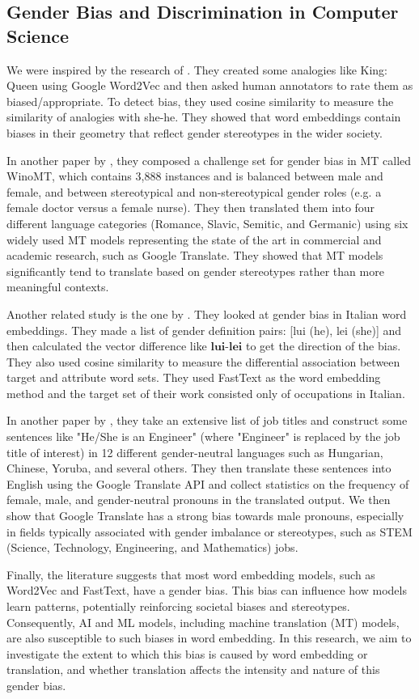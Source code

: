 \subsection{Gender Bias and Discrimination in Computer Science}

We were inspired by the research of \cite{bolukbasi2016man}. They created some analogies like King: Queen using Google Word2Vec and then asked human annotators to rate them as biased/appropriate. To detect bias, they used cosine similarity to measure the similarity of analogies with she-he. They showed that word embeddings contain biases in their geometry that reflect gender stereotypes in the wider society. 

In another paper by \cite{Stanovsky2019-hs}, they composed a challenge set for gender bias in MT called WinoMT, which contains 3,888 instances and is balanced between male and female, and between stereotypical and non-stereotypical gender roles (e.g. a female doctor versus a female nurse). They then translated them into four different language categories (Romance, Slavic, Semitic, and Germanic) using six widely used MT models representing the state of the art in commercial and academic research, such as Google Translate. They showed that MT models significantly tend to translate based on gender stereotypes rather than more meaningful contexts.

Another related study is the one by \cite{Biasion2020-yb}. They looked at gender bias in Italian word embeddings. They made a list of gender definition pairs: [lui (he), lei (she)] and then calculated the vector difference like \(\mathbf{lui}\)-\(\mathbf{lei}\) to get the direction of the bias. They also used cosine similarity to measure the differential association between target and attribute word sets. They used FastText as the word embedding method and the target set of their work consisted only of occupations in Italian. 

In another paper by \cite{Prates2020-dc}, they take an extensive list of job titles and construct some sentences like "He/She is an Engineer" (where "Engineer" is replaced by the job title of interest) in 12 different gender-neutral languages such as Hungarian, Chinese, Yoruba, and several others. They then translate these sentences into English using the Google Translate API and collect statistics on the frequency of female, male, and gender-neutral pronouns in the translated output. We then show that Google Translate has a strong bias towards male pronouns, especially in fields typically associated with gender imbalance or stereotypes, such as STEM (Science, Technology, Engineering, and Mathematics) jobs.

Finally, the literature suggests that most word embedding models, such as Word2Vec and FastText, have a gender bias. This bias can influence how models learn patterns, potentially reinforcing societal biases and stereotypes. Consequently, AI and ML models, including machine translation (MT) models, are also susceptible to such biases in word embedding. In this research, we aim to investigate the extent to which this bias is caused by word embedding or translation, and whether translation affects the intensity and nature of this gender bias.